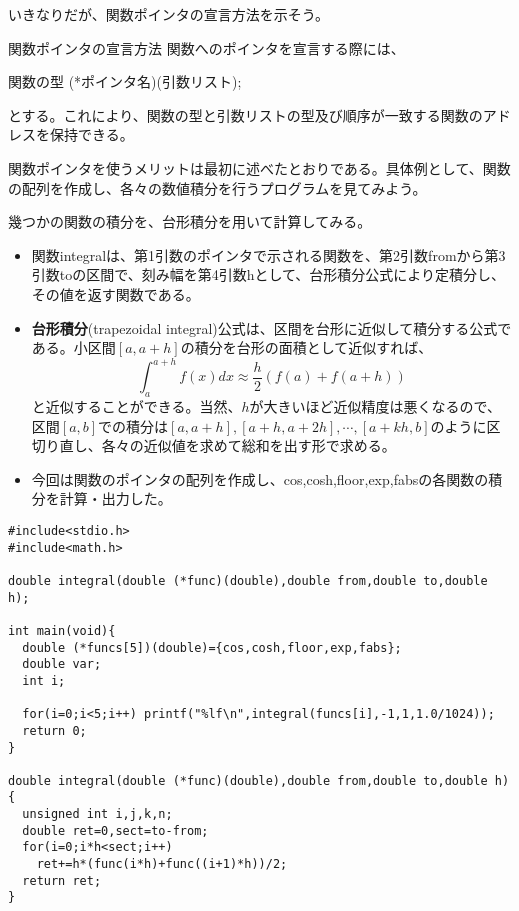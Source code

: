 いきなりだが、関数ポインタの宣言方法を示そう。
\begin{itembox}[l]{関数ポインタの宣言方法}
関数へのポインタを宣言する際には、
\begin{code}
関数の型 (*ポインタ名)(引数リスト);
\end{code}
とする。これにより、関数の型と引数リストの型及び順序が一致する関数のアドレスを保持できる。 
\end{itembox}

関数ポインタを使うメリットは最初に述べたとおりである。具体例として、関数の配列を作成し、各々の数値積分を行うプログラムを見てみよう。
\begin{boxnote}
幾つかの関数の積分を、台形積分を用いて計算してみる。
\begin{itemize}
\item 関数integralは、第1引数のポインタで示される関数を、第2引数fromから第3引数toの区間で、刻み幅を第4引数hとして、台形積分公式により定積分し、その値を返す関数である。
\item \textbf{台形積分}(trapezoidal integral)公式は、区間を台形に近似して積分する公式である。小区間$[a,a+h]$の積分を台形の面積として近似すれば、
\[\int^{a+h}_{a} f(x)dx\approx \frac{h}{2}\left(f(a)+f(a+h)\right)\]
と近似することができる。当然、$h$が大きいほど近似精度は悪くなるので、区間$[a,b]$での積分は$[a,a+h],[a+h,a+2h],\cdots,[a+kh,b]$のように区切り直し、各々の近似値を求めて総和を出す形で求める。
\end{itemize}
\end{boxnote}
\begin{boxnote}
\begin{itemize}
\item 今回は関数のポインタの配列を作成し、cos,cosh,floor,exp,fabsの各関数の積分を計算・出力した。
\end{itemize}
\begin{lstlisting}[caption=関数の台形積分,label=program11_4]
#include<stdio.h>
#include<math.h>

double integral(double (*func)(double),double from,double to,double h);

int main(void){
  double (*funcs[5])(double)={cos,cosh,floor,exp,fabs};
  double var;
  int i;

  for(i=0;i<5;i++) printf("%lf\n",integral(funcs[i],-1,1,1.0/1024));
  return 0;
}

double integral(double (*func)(double),double from,double to,double h){
  unsigned int i,j,k,n;
  double ret=0,sect=to-from;
  for(i=0;i*h<sect;i++)
    ret+=h*(func(i*h)+func((i+1)*h))/2;
  return ret;
}
\end{lstlisting}
\end{boxnote}

